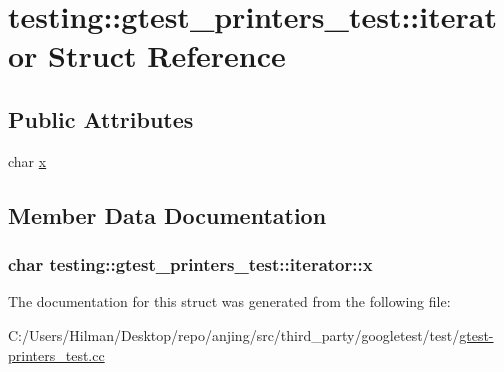 \hypertarget{structtesting_1_1gtest__printers__test_1_1iterator}{}\section{testing\+:\+:gtest\+\_\+printers\+\_\+test\+:\+:iterator Struct Reference}
\label{structtesting_1_1gtest__printers__test_1_1iterator}
\subsection*{Public Attributes}
\begin{DoxyCompactItemize}
\item 
char \hyperlink{structtesting_1_1gtest__printers__test_1_1iterator_a3d4d056077d3b3869259bdfd60a0778f}{x}
\end{DoxyCompactItemize}


\subsection{Member Data Documentation}
\hypertarget{structtesting_1_1gtest__printers__test_1_1iterator_a3d4d056077d3b3869259bdfd60a0778f}{}
\subsubsection[{x}]{\setlength{\rightskip}{0pt plus 5cm}char testing\+::gtest\+\_\+printers\+\_\+test\+::iterator\+::x}\label{structtesting_1_1gtest__printers__test_1_1iterator_a3d4d056077d3b3869259bdfd60a0778f}


The documentation for this struct was generated from the following file\+:\begin{DoxyCompactItemize}
\item 
C\+:/\+Users/\+Hilman/\+Desktop/repo/anjing/src/third\+\_\+party/googletest/test/\hyperlink{gtest-printers__test_8cc}{gtest-\/printers\+\_\+test.\+cc}\end{DoxyCompactItemize}
